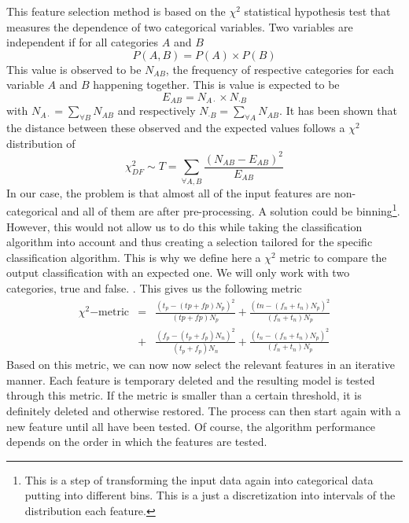 This feature selection method is based on the $\chi^2$ statistical hypothesis test that measures the dependence of two categorical variables. Two variables are independent if for all categories $A$ and $B$
\begin{equation}
    P(A, B) = P(A) \times P(B)
\end{equation}
This value is observed to be $N_{AB}$, the frequency of respective categories for each variable $A$ and $B$ happening together. This is value is expected to be
\begin{equation}
    E_{AB} = N_{A\cdot} \times N_{\cdot B}
\end{equation}
with $N_{A\cdot} = \sum_{\forall B} N_{AB}$ and respectively $N_{\cdot B} = \sum_{\forall A} N_{AB}$. It has been shown  that the distance between these observed and the expected values follows a $\chi^2$ distribution of 
\begin{equation}
    \chi^2_{DF} \sim T = \sum_{\forall A,B} \frac{\left(N_{AB}-E_{AB}\right)^2}{E_{AB}}
\end{equation}
In our case, the problem is that almost all of the input features are non-categorical and all of them are after pre-processing. A solution could be binning\footnote{This is a step of transforming the input data again into categorical data putting into different bins. This is a just a discretization into intervals of the distribution each feature.}. However, this would not allow us to do this while taking the classification algorithm into account and thus creating a selection tailored for the specific classification algorithm. This is why we define here a $\chi^2$ metric to compare the output classification with an expected one. We will only work with two categories, true and false. . This gives us the following metric
\begin{eqnarray}
    \chi^2\mathrm{-metric} &=& \frac{\left(t_p - (tp+fp)N_p \right)^2}{(tp+fp)N_p} + \frac{\left(tn - (f_n+t_n)N_p \right)^2}{(f_n+t_n)N_p} \\
    &+& \frac{\left(f_p - (t_p+f_p)N_n \right)^2}{ (t_p+f_p)N_n} + \frac{\left(t_n-(f_n+t_n)N_p \right)^2}{(f_n+t_n)N_p}
\end{eqnarray}
Based on this metric, we can now now select the relevant features in an iterative manner. Each feature is temporary deleted and the resulting model is tested through this metric. If the metric is smaller than a certain threshold, it is definitely deleted and otherwise restored. The process can then start again with a new feature until all have been tested. Of course, the algorithm performance depends on the order in which the features are tested.

